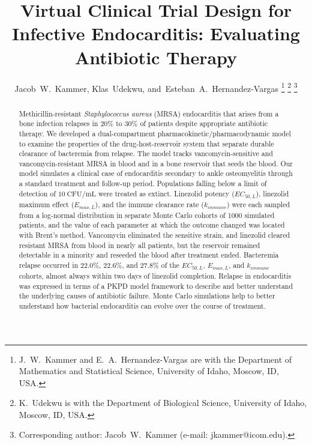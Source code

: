 \documentclass[journal]{IEEEtran}
\begin{document}
\title{Virtual Clinical Trial Design for Infective Endocarditis: Evaluating Antibiotic Therapy}

\author{Jacob~W.~Kammer,
        Klas~Udekwu,
        and~Esteban~A.~Hernandez-Vargas%
\thanks{J.~W.~Kammer and E.~A.~Hernandez-Vargas are with the Department of Mathematics and Statistical Science, University of Idaho, Moscow, ID, USA.}%
\thanks{K.~Udekwu is with the Department of Biological Science, University of Idaho, Moscow, ID, USA.}%
\thanks{Corresponding author: Jacob~W.~Kammer (e-mail: jkammer@icom.edu).}}


\maketitle

\begin{abstract}
Methicillin-resistant \textit{Staphylococcus aureus} (MRSA) endocarditis that
arises from a bone infection relapses in 20\% to 30\% of patients despite
appropriate antibiotic therapy. We developed a dual-compartment
pharmacokinetic/pharmacodynamic model to examine the properties of the
drug-host-reservoir system that separate durable clearance of bacteremia from
relapse. The model tracks vancomycin-sensitive and vancomycin-resistant MRSA
in blood and in a bone reservoir that seeds the blood.  Our model simulates a
clinical case of endocarditis secondary to ankle osteomyelitis through a standard treatment and follow-up period. Populations
falling below a limit of detection of $10~\mathrm{CFU/mL}$ were treated as
extinct. Linezolid potency ($EC_{50,L}$), linezolid maximum effect
($E_{max,L}$), and the immune clearance rate ($k_{immune}$) were each sampled
from a log-normal distribution in separate Monte Carlo cohorts of 1000
simulated patients, and the value of each parameter at which the outcome
changed was located with Brent's method. Vancomycin eliminated the sensitive
strain, and linezolid cleared resistant MRSA from blood in nearly all
patients, but the reservoir remained detectable in a minority and reseeded
the blood after treatment ended. Bacteremia relapse occurred in 22.0\%, 22.6\%, and
27.8\% of the $EC_{50,L}$, $E_{max,L}$, and $k_{immune}$ cohorts, almost
always within two days of linezolid completion. Relapse in endocarditis was expressed in terms of a PKPD model framework to describe and better understand the underlying causes of antibiotic failure.  Monte Carlo simulations help to better understand how bacterial endocarditis can evolve over the course of treatment.
\end{abstract}
\end{document}
